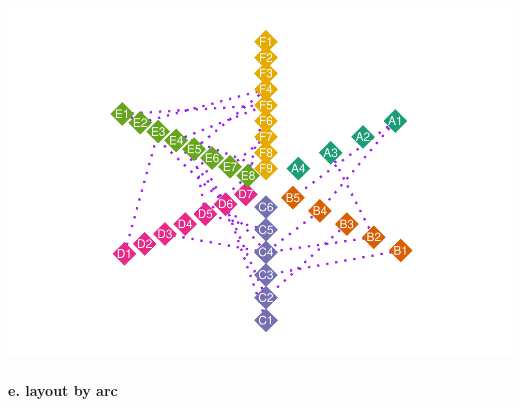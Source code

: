 \documentclass[
]{article}
\let\oldparagraph\paragraph
\renewcommand{\paragraph}[1]{\oldparagraph{#1}\mbox{}}
\begin{document}
\includegraphics{ReadMe1_files/figure-latex/unnamed-chunk-14-1.pdf}

\hypertarget{e.-layout-by-arc}{%
\paragraph{e. layout by arc}\label{e.-layout-by-arc}}
\end{document}
